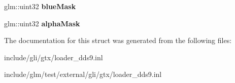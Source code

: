 \begin{DoxyCompactItemize}
\item 
\hypertarget{structgli_1_1gtx_1_1loader__dds9_1_1detail_1_1ddsPixelFormat_a1797e57d11984555e1075f223fc5fac4}{glm\-::uint32 {\bfseries blue\-Mask}}\label{structgli_1_1gtx_1_1loader__dds9_1_1detail_1_1ddsPixelFormat_a1797e57d11984555e1075f223fc5fac4}

\item 
\hypertarget{structgli_1_1gtx_1_1loader__dds9_1_1detail_1_1ddsPixelFormat_a599234af3dcf0fce1383098c993129c6}{glm\-::uint32 {\bfseries alpha\-Mask}}\label{structgli_1_1gtx_1_1loader__dds9_1_1detail_1_1ddsPixelFormat_a599234af3dcf0fce1383098c993129c6}

\end{DoxyCompactItemize}


\-The documentation for this struct was generated from the following files\-:\begin{DoxyCompactItemize}
\item 
include/gli/gtx/loader\-\_\-dds9.\-inl\item 
include/glm/test/external/gli/gtx/loader\-\_\-dds9.\-inl\end{DoxyCompactItemize}
